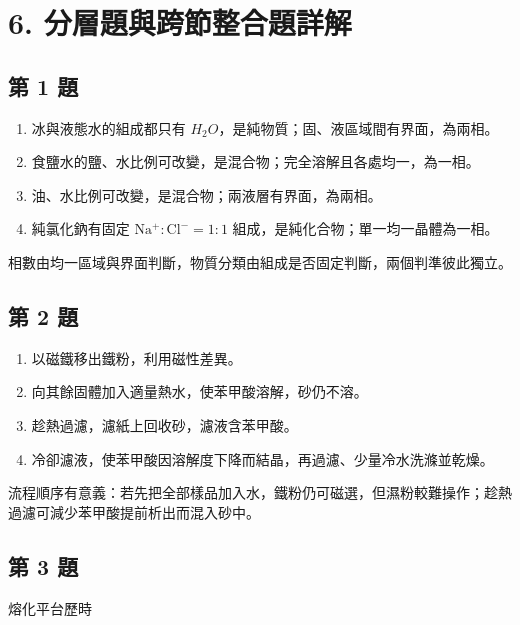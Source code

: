 \documentclass[11pt,a4paper]{article}
\providecommand{\tightlist}{%
  \setlength{\itemsep}{0pt}\setlength{\parskip}{0pt}}
\begin{document}
\clearpage

\section{6. 分層題與跨節整合題詳解}\label{ux5206ux5c64ux984cux8207ux8de8ux7bc0ux6574ux5408ux984cux8a73ux89e3}

\subsection{第 1 題}\label{ux7b2c-1-ux984c}

\begin{enumerate}
\def\labelenumi{\arabic{enumi}.}
\tightlist
\item
  冰與液態水的組成都只有 \(H_2O\)，是純物質；固、液區域間有界面，為兩相。
\item
  食鹽水的鹽、水比例可改變，是混合物；完全溶解且各處均一，為一相。
\item
  油、水比例可改變，是混合物；兩液層有界面，為兩相。
\item
  純氯化鈉有固定 \(\mathrm{Na^+:Cl^-}=1:1\) 組成，是純化合物；單一均一晶體為一相。
\end{enumerate}

相數由均一區域與界面判斷，物質分類由組成是否固定判斷，兩個判準彼此獨立。

\subsection{第 2 題}\label{ux7b2c-2-ux984c}

\begin{enumerate}
\def\labelenumi{\arabic{enumi}.}
\tightlist
\item
  以磁鐵移出鐵粉，利用磁性差異。
\item
  向其餘固體加入適量熱水，使苯甲酸溶解，砂仍不溶。
\item
  趁熱過濾，濾紙上回收砂，濾液含苯甲酸。
\item
  冷卻濾液，使苯甲酸因溶解度下降而結晶，再過濾、少量冷水洗滌並乾燥。
\end{enumerate}

流程順序有意義：若先把全部樣品加入水，鐵粉仍可磁選，但濕粉較難操作；趁熱過濾可減少苯甲酸提前析出而混入砂中。

\subsection{第 3 題}\label{ux7b2c-3-ux984c}

熔化平台歷時
\end{document}
